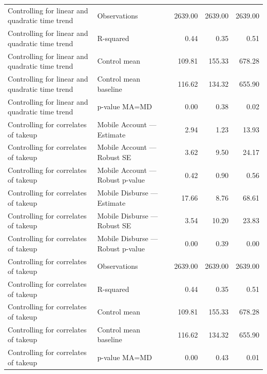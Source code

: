 \begin{tabular}{llrrr}
Controlling for linear and quadratic time trend & Observations & 2639.00 & 2639.00 & 2639.00\\
Controlling for linear and quadratic time trend & R-squared & 0.44 & 0.35 & 0.51\\
Controlling for linear and quadratic time trend & Control mean & 109.81 & 155.33 & 678.28\\
\addlinespace
Controlling for linear and quadratic time trend & Control mean baseline & 116.62 & 134.32 & 655.90\\
Controlling for linear and quadratic time trend & p-value MA=MD & 0.00 & 0.38 & 0.02\\
Controlling for correlates of takeup & Mobile Account — Estimate & 2.94 & 1.23 & 13.93\\
Controlling for correlates of takeup & Mobile Account — Robust SE & 3.62 & 9.50 & 24.17\\
Controlling for correlates of takeup & Mobile Account — Robust p-value & 0.42 & 0.90 & 0.56\\
\addlinespace
Controlling for correlates of takeup & Mobile Disburse — Estimate & 17.66 & 8.76 & 68.61\\
Controlling for correlates of takeup & Mobile Disburse — Robust SE & 3.54 & 10.20 & 23.83\\
Controlling for correlates of takeup & Mobile Disburse — Robust p-value & 0.00 & 0.39 & 0.00\\
Controlling for correlates of takeup & Observations & 2639.00 & 2639.00 & 2639.00\\
Controlling for correlates of takeup & R-squared & 0.44 & 0.35 & 0.51\\
\addlinespace
Controlling for correlates of takeup & Control mean & 109.81 & 155.33 & 678.28\\
Controlling for correlates of takeup & Control mean baseline & 116.62 & 134.32 & 655.90\\
Controlling for correlates of takeup & p-value MA=MD & 0.00 & 0.43 & 0.01\\
\bottomrule
\end{tabular}

